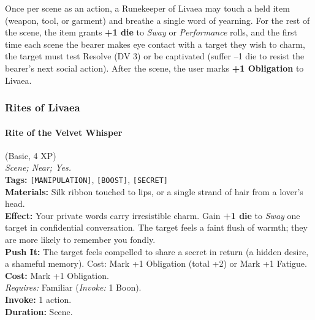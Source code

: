 Once per scene as an action, a Runekeeper of Livaea may touch a held item (weapon, tool, or garment) and breathe a single word of yearning. For the rest of the scene, the item grants \textbf{+1 die} to \textit{Sway} or \textit{Performance} rolls, and the first time each scene the bearer makes eye contact with a target they wish to charm, the target must test Resolve (DV 3) or be captivated (suffer --1 die to resist the bearer's next social action). After the scene, the user marks \textbf{+1 Obligation} to Livaea.

\subsubsection*{Rites of Livaea}

\paragraph{Rite of the Velvet Whisper} (Basic, 4 XP) \hfill \\
\emph{Scene; Near; Yes.} \\
\textbf{Tags:} \texttt{[MANIPULATION]}, \texttt{[BOOST]}, \texttt{[SECRET]} \\
\textbf{Materials:} Silk ribbon touched to lips, or a single strand of hair from a lover's head. \\
\textbf{Effect:} Your private words carry irresistible charm. Gain \textbf{+1 die} to \textit{Sway} one target in confidential conversation. The target feels a faint flush of warmth; they are more likely to remember you fondly. \\
\textbf{Push It:} The target feels compelled to share a secret in return (a hidden desire, a shameful memory). Cost: Mark +1 Obligation (total +2) or Mark +1 Fatigue. \\
\textbf{Cost:} Mark +1 Obligation. \\
\textit{Requires:} Familiar (\textit{Invoke:} 1 Boon). \\
\textbf{Invoke:} 1 action. \\
\textbf{Duration:} Scene.

